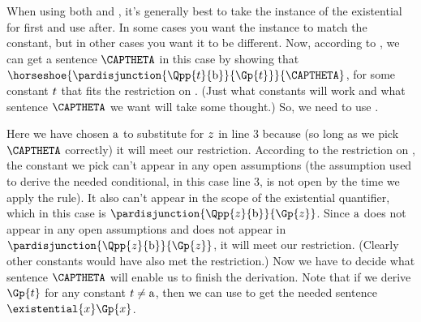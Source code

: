 When using both  and , it’s generally best to take the instance of the existential for  first and use  after. In some cases
you want the  instance to match the  constant, but in other cases you want it to be different.
Now, according to , we can get a sentence $\CAPTHETA$ in this case by showing that $\horseshoe{\pardisjunction{\Qpp{\variable{t}}{\constant{b}}}{\Gp{\variable{t}}}}{\CAPTHETA}$, for some constant $t$ that fits the restriction on .
(Just what constants will work and what sentence $\CAPTHETA$ we want will take some thought.)
So, we need to use . 
\begin{gproof}[\label{GQDExampleI}]
\end{gproof}
Here we have chosen $\mathrm{a}$ to substitute for $z$ in line 3 because (so long as we pick $\CAPTHETA$ correctly) it will meet our restriction. 
According to the restriction on , the constant we pick can't appear in any open assumptions (the assumption used to derive the needed conditional, in this case line 3, is not open by the time we apply the rule). 
It also can't appear in the scope of the existential quantifier, which in this case is $\pardisjunction{\Qpp{\variable{z}}{\constant{b}}}{\Gp{\variable{z}}}$. 
Since $\mathrm{a}$ does not appear in any open assumptions and does not appear in $\pardisjunction{\Qpp{\variable{z}}{\constant{b}}}{\Gp{\variable{z}}}$, it will meet our restriction.
(Clearly other constants would have also met the restriction.)
Now we have to decide what sentence $\CAPTHETA$ will enable us to finish the derivation. 
Note that if we derive $\Gp{\variable{t}}$ for any constant $t\neq\mathrm{a}$, then we can use  to get the needed sentence $\existential{\variable{x}}\Gp{\variable{x}}$. 
